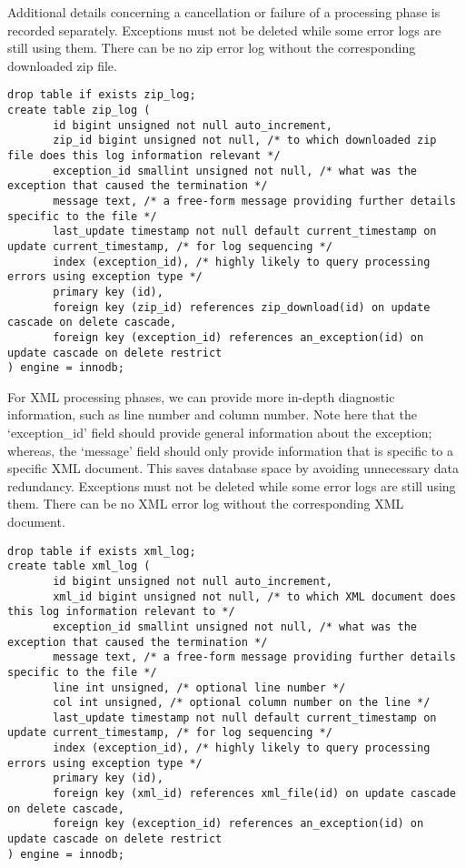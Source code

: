 \documentclass[a4paper,11pt]{article}
\begin{document}
\begin{landscape}
Additional details concerning a cancellation or failure of a processing phase is recorded separately. Exceptions must not be deleted while some error logs are still using them. There can be no zip error log without the corresponding downloaded zip file.

\begin{Verbatim}[fontsize=\small,formatcom=\color{blue}]
drop table if exists zip_log;
create table zip_log (
       id bigint unsigned not null auto_increment,
       zip_id bigint unsigned not null, /* to which downloaded zip file does this log information relevant */
       exception_id smallint unsigned not null, /* what was the exception that caused the termination */
       message text, /* a free-form message providing further details specific to the file */
       last_update timestamp not null default current_timestamp on update current_timestamp, /* for log sequencing */
       index (exception_id), /* highly likely to query processing errors using exception type */
       primary key (id),
       foreign key (zip_id) references zip_download(id) on update cascade on delete cascade,
       foreign key (exception_id) references an_exception(id) on update cascade on delete restrict
) engine = innodb;
\end{Verbatim}

For XML processing phases, we can provide more in-depth diagnostic information, such as line number and column number. Note here that the `exception\_id' field should provide general information about the exception; whereas, the `message' field should only provide information that is specific to a specific XML document. This saves database space by avoiding unnecessary data redundancy. Exceptions must not be deleted while some error logs are still using them. There can be no XML error log without the corresponding XML document.

\begin{Verbatim}[fontsize=\small,formatcom=\color{blue}]
drop table if exists xml_log;
create table xml_log (
       id bigint unsigned not null auto_increment,
       xml_id bigint unsigned not null, /* to which XML document does this log information relevant to */
       exception_id smallint unsigned not null, /* what was the exception that caused the termination */
       message text, /* a free-form message providing further details specific to the file */
       line int unsigned, /* optional line number */
       col int unsigned, /* optional column number on the line */
       last_update timestamp not null default current_timestamp on update current_timestamp, /* for log sequencing */
       index (exception_id), /* highly likely to query processing errors using exception type */
       primary key (id),
       foreign key (xml_id) references xml_file(id) on update cascade on delete cascade,
       foreign key (exception_id) references an_exception(id) on update cascade on delete restrict
) engine = innodb;
\end{Verbatim}


\end{landscape}
\end{document}
